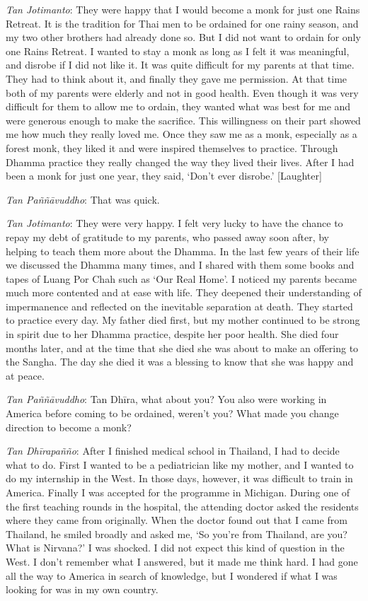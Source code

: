 \emph{Tan Jotimanto}: They were happy that I would become a monk for
just one Rains Retreat. It is the tradition for Thai men to be ordained
for one rainy season, and my two other brothers had already done so. But
I did not want to ordain for only one Rains Retreat. I wanted to stay a
monk as long as I felt it was meaningful, and disrobe if I did not like
it. It was quite difficult for my parents at that time. They had to
think about it, and finally they gave me permission. At that time both
of my parents were elderly and not in good health. Even though it was
very difficult for them to allow me to ordain, they wanted what was best
for me and were generous enough to make the sacrifice. This willingness
on their part showed me how much they really loved me. Once they saw me
as a monk, especially as a forest monk, they liked it and were inspired
themselves to practice. Through Dhamma practice they really changed the
way they lived their lives. After I had been a monk for just one year, 
they said, `Don't ever disrobe.' [Laughter]

\emph{Tan Paññāvuddho}: That was quick.

\emph{Tan Jotimanto}: They were very happy. I felt very lucky to have
the chance to repay my debt of gratitude to my parents, who passed away
soon after, by helping to teach them more about the Dhamma. In the last
few years of their life we discussed the Dhamma many times, and I shared
with them some books and tapes of Luang Por Chah such as `Our Real
Home'. I noticed my parents became much more contented and at ease with
life. They deepened their understanding of impermanence and reflected on
the inevitable separation at death. They started to practice every day. 
My father died first, but my mother continued to be strong in spirit due
to her Dhamma practice, despite her poor health. She died four months
later, and at the time that she died she was about to make an offering
to the Sangha. The day she died it was a blessing to know that she was
happy and at peace. 

\emph{Tan Paññāvuddho}: Tan Dhīra, what about you? You also were
working in America before coming to be ordained, weren't you? What made
you change direction to become a monk? 

\emph{Tan Dhīrapañño}: After I finished medical school in Thailand, I
had to decide what to do. First I wanted to be a pediatrician like my
mother, and I wanted to do my internship in the West. In those days, 
however, it was difficult to train in America. Finally I was accepted
for the programme in Michigan. During one of the first teaching rounds
in the hospital, the attending doctor asked the residents where they
came from originally. When the doctor found out that I came from
Thailand, he smiled broadly and asked me, `So you're from Thailand, are
you? What is Nirvana?' I was shocked. I did not expect this kind of
question in the West. I don't remember what I answered, but it made me
think hard. I had gone all the way to America in search of knowledge, 
but I wondered if what I was looking for was in my own country. 

